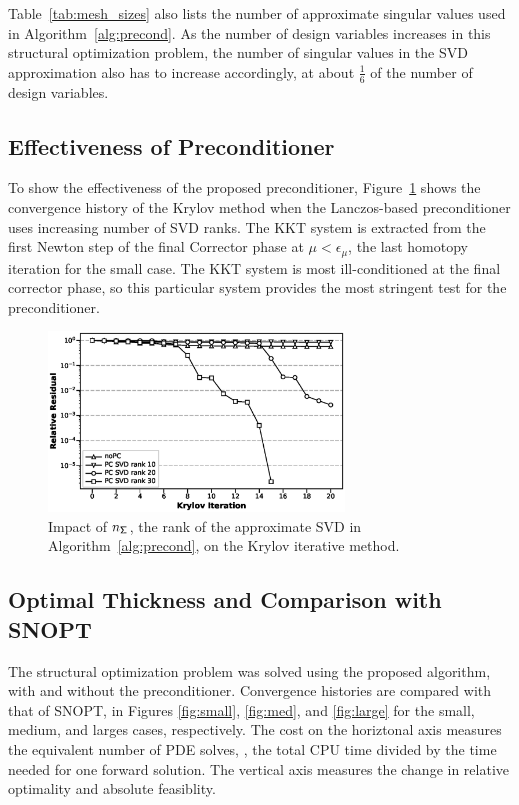 Table~\ref{tab:mesh_sizes} also lists the number of approximate singular values
used in Algorithm~\ref{alg:precond}.  As the number of design variables
increases in this structural optimization problem, the number of singular values
in the SVD approximation also has to increase accordingly, at about $\frac{1}{6}$
of the number of design variables.

\subsection{Effectiveness of Preconditioner}
To show the effectiveness of the proposed preconditioner, 
Figure~\ref{fig:svdrank} shows the convergence history of the Krylov
method when the Lanczos-based preconditioner uses 
increasing number of SVD ranks. The KKT system is extracted from 
the first Newton step of the final Corrector phase 
at $\mu < \epsilon_{\mu}$, the last homotopy iteration for the small case. 
The KKT system is most ill-conditioned at the final corrector phase, so this particular system provides the most stringent test for the preconditioner.

\begin{figure}[tbp]
  \centering
  \includegraphics[width=0.7\textwidth]{./figs/chap6_fstopo/tiny_svd_ranks.eps}
  \caption{Impact of $n_{\mathsf{\Sigma}}$, the rank of the approximate SVD in
    Algorithm~\ref{alg:precond}, on the Krylov iterative method.
  \label{fig:svdrank}}
\end{figure}

\subsection{Optimal Thickness and Comparison with SNOPT}
The structural optimization problem was solved using the proposed algorithm,
with and without the preconditioner. Convergence histories are compared with 
that of SNOPT, in Figures \ref{fig:small}, \ref{fig:med}, and \ref{fig:large} for the 
small, medium, and larges cases, respectively. The cost on the horiztonal axis 
measures the equivalent number of PDE solves, 
\ie, the total CPU time divided by the time needed for one
forward solution.  The vertical axis measures the change in relative optimality and
absolute feasiblity.    
  
